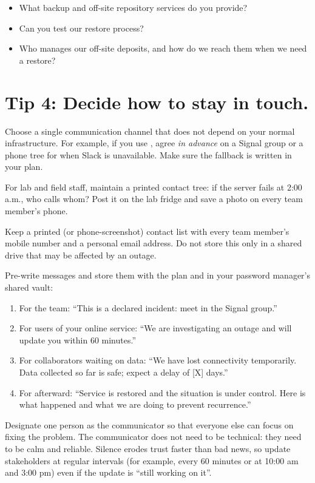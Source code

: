 \documentclass[10pt,letterpaper]{article}
\begin{document}
\begin{notebox}
  \begin{itemize}
  \item What backup and off-site repository services do you provide?
  \item Can you test our restore process?
  \item Who manages our off-site deposits, and how do we reach them when we need a restore?
  \end{itemize}
\end{notebox}

\section*{Tip 4: Decide how to stay in touch.}

Choose a single communication channel that does not depend on your normal
infrastructure. For example, if you use ,
agree \emph{in advance} on a Signal group or a phone tree for when Slack is
unavailable.  Make sure the fallback is written in your plan.

For lab and field staff, maintain a printed contact tree: if the server fails at
2:00 a.m., who calls whom? Post it on the lab fridge and save a photo on every
team member's phone.

Keep a printed (or phone-screenshot) contact list with every team member's
mobile number and a personal email address. Do not store this only in a shared
drive that may be affected by an outage.

Pre-write messages and store them with the plan and in your password manager's
shared vault:

\begin{enumerate}
\item
  For the team: ``This is a declared incident: meet in the Signal group.''
\item
  For users of your online service: ``We are investigating an outage and
  will update you within 60 minutes.''
\item
  For collaborators waiting on data: ``We have lost connectivity temporarily.
  Data collected so far is safe; expect a delay of [X] days.''
\item
  For afterward: ``Service is restored and the situation is under control.
  Here is what happened and what we are doing to prevent recurrence.''
\end{enumerate}

Designate one person as the communicator so that everyone else can focus on
fixing the problem. The communicator does not need to be technical: they need to
be calm and reliable. Silence erodes trust faster than bad news, so update
stakeholders at regular intervals (for example, every 60 minutes or at 10:00 am
and 3:00 pm) even if the update is ``still working on it''.
\end{document}
